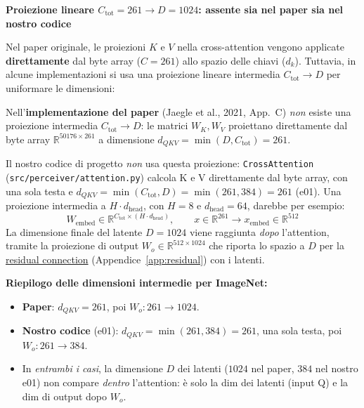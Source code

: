 \documentclass[
  11pt,
]{article}
\begin{document}
\textbf{Proiezione lineare $C_{\text{tot}} = 261 \to D = 1024$: assente sia nel paper sia nel nostro codice}

Nel paper originale, le proiezioni $K$ e $V$ nella cross-attention vengono applicate \textbf{direttamente} dal byte array ($C=261$) allo spazio delle chiavi ($d_k$). Tuttavia, in alcune implementazioni si usa una proiezione lineare intermedia $C_{\text{tot}} \to D$ per uniformare le dimensioni:

\begin{formulabox}[title={\textbf{Proiezione lineare dell'input (non nel paper originale)}}]
Nell'\textbf{implementazione del paper} (Jaegle et al., 2021, App.\ C) \emph{non} esiste una proiezione intermedia $C_{\text{tot}} \to D$: le matrici $W_K, W_V$ proiettano direttamente dal byte array $\mathbb{R}^{50176 \times 261}$ a dimensione $d_{QKV} = \min(D, C_{\text{tot}}) = 261$.

Il nostro codice di progetto \emph{non} usa questa proiezione: \texttt{CrossAttention} (\texttt{src/perceiver/attention.py}) calcola K e V direttamente dal byte array, con una sola testa e $d_{QKV} = \min(C_{\text{tot}}, D) = \min(261, 384) = 261$ (e01). Una proiezione intermedia a $H \cdot d_{\text{head}}$, con $H = 8$ e $d_{\text{head}} = 64$, darebbe per esempio:
\[
W_{\text{embed}} \in \mathbb{R}^{C_{\text{tot}} \times (H \cdot d_{\text{head}})},\qquad x \in \mathbb{R}^{261} \longrightarrow x_{\text{embed}} \in \mathbb{R}^{512}
\]
La dimensione finale del latente $D = 1024$ viene raggiunta \emph{dopo} l'attention, tramite la proiezione di output $W_o \in \mathbb{R}^{512 \times 1024}$ che riporta lo spazio a $D$ per la \hyperref[app:residual]{residual connection} (Appendice~\ref{app:residual}) con i latenti.

\textbf{Riepilogo delle dimensioni intermedie per ImageNet:}
\begin{itemize}
\item \textbf{Paper}: $d_{QKV} = 261$, poi $W_o: 261 \to 1024$.
\item \textbf{Nostro codice} (e01): $d_{QKV} = \min(261, 384) = 261$, una sola testa, poi $W_o: 261 \to 384$.
\item In \emph{entrambi i casi}, la dimensione $D$ dei latenti ($1024$ nel paper, $384$ nel nostro e01) non compare \emph{dentro} l'attention: è solo la dim dei latenti (input Q) e la dim di output dopo $W_o$.
\end{itemize}
\end{formulabox}
\end{document}
